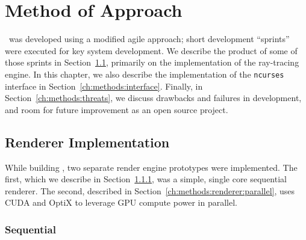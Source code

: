 %
%
%
\chapter{Method of Approach} \label{ch:methods}

\name\ was developed using a modified agile approach; short development ``sprints'' were executed for key system development.
We describe the product of some of those sprints in Section~\ref{ch:methods:renderer}, primarily on the implementation of the ray-tracing engine.
In this chapter, we also describe the implementation of the \texttt{ncurses} interface in Section~\ref{ch:methods:interface}.
Finally, in Section~\ref{ch:methods:threats}, we discuss drawbacks and failures in development, and room for future improvement as an open source project.


\section{Renderer Implementation} \label{ch:methods:renderer}
While building \name, two separate render engine prototypes were implemented.
The first, which we describe in Section~\ref{ch:methods:renderer:sequential}, was a simple, single core sequential renderer.
The second, described in Section~\ref{ch:methods:renderer:parallel}, uses CUDA \cite{nvidia2011cuda} and OptiX \cite{parker2010optix} to leverage GPU compute power in parallel.


\subsection{Sequential} \label{ch:methods:renderer:sequential}

 \label{ch:methods:renderer:sequential:motivation}

 \label{ch:methods:renderer:sequential:libraries}

 \label{ch:methods:renderer:sequential:design}

 \label{ch:methods:renderer:sequential:proto}

 \label{ch:methods:renderer:sequential:takeaway}

